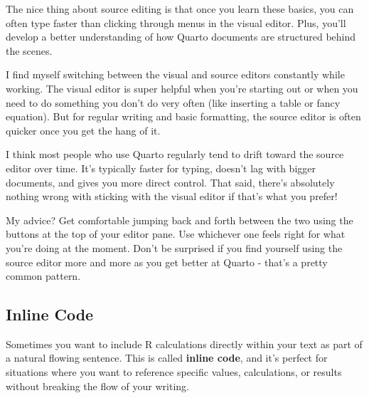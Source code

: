 \documentclass[
  letterpaper,
]{book}
\begin{document}
The nice thing about source editing is that once you learn these basics,
you can often type faster than clicking through menus in the visual
editor. Plus, you'll develop a better understanding of how Quarto
documents are structured behind the scenes.

\begin{tcolorbox}[enhanced jigsaw, colframe=quarto-callout-tip-color-frame, breakable, arc=.35mm, bottomtitle=1mm, bottomrule=.15mm, colbacktitle=quarto-callout-tip-color!10!white, rightrule=.15mm, colback=white, opacityback=0, opacitybacktitle=0.6, coltitle=black, left=2mm, toptitle=1mm, toprule=.15mm, titlerule=0mm, leftrule=.75mm, title=\textcolor{quarto-callout-tip-color}{\faLightbulb}\hspace{0.5em}{May the Format Be With You: Editor Hopping}]

I find myself switching between the visual and source editors constantly
while working. The visual editor is super helpful when you're starting
out or when you need to do something you don't do very often (like
inserting a table or fancy equation). But for regular writing and basic
formatting, the source editor is often quicker once you get the hang of
it.

I think most people who use Quarto regularly tend to drift toward the
source editor over time. It's typically faster for typing, doesn't lag
with bigger documents, and gives you more direct control. That said,
there's absolutely nothing wrong with sticking with the visual editor if
that's what you prefer!

My advice? Get comfortable jumping back and forth between the two using
the buttons at the top of your editor pane. Use whichever one feels
right for what you're doing at the moment. Don't be surprised if you
find yourself using the source editor more and more as you get better at
Quarto - that's a pretty common pattern.

\end{tcolorbox}

\subsection{Inline Code}\label{inline-code}

Sometimes you want to include R calculations directly within your text
as part of a natural flowing sentence. This is called \textbf{inline
code}, and it's perfect for situations where you want to reference
specific values, calculations, or results without breaking the flow of
your writing.
\end{document}
